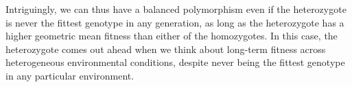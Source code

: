 
Intriguingly, we can thus have a balanced polymorphism even if the heterozygote is never the fittest genotype in any generation, as long as the heterozygote has a higher geometric mean fitness than either of the homozygotes. In this case, the heterozygote comes out ahead when we think about long-term fitness across heterogeneous environmental conditions, despite never being the fittest genotype in any particular environment. %



